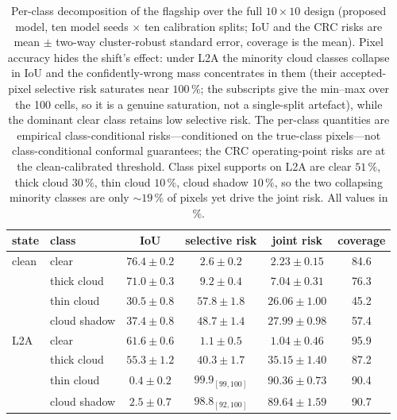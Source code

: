 \documentclass[preprint,3p,times]{elsarticle}
\begin{document}
\begin{table}[t]
\centering
\caption{Per-class decomposition of the flagship over the full $10\times10$ design (proposed model, ten model seeds $\times$ ten calibration splits; IoU and the CRC risks are mean $\pm$ two-way cluster-robust standard error, coverage is the mean). Pixel accuracy hides the shift's effect: under L2A the minority cloud classes collapse in IoU and the confidently-wrong mass concentrates in them (their accepted-pixel selective risk saturates near $100\,\%$; the subscripts give the min--max over the 100 cells, so it is a genuine saturation, not a single-split artefact), while the dominant clear class retains low selective risk. The per-class quantities are empirical class-conditional risks---conditioned on the true-class pixels---not class-conditional conformal guarantees; the CRC operating-point risks are at the clean-calibrated threshold. Class pixel supports on L2A are clear $51\,\%$, thick cloud $30\,\%$, thin cloud $10\,\%$, cloud shadow $10\,\%$, so the two collapsing minority classes are only ${\sim}19\,\%$ of pixels yet drive the joint risk. All values in \%.}
\label{tab:classwise}
\begin{tabular}{llcccc}
\toprule
state & class & IoU & selective risk & joint risk & coverage \\
\midrule
clean & clear        & $76.4\pm0.2$ & $2.6\pm0.2$ & $2.23\pm0.15$ & 84.6 \\
      & thick cloud  & $71.0\pm0.3$ & $9.2\pm0.4$ & $7.04\pm0.31$ & 76.3 \\
      & thin cloud   & $30.5\pm0.8$ & $57.8\pm1.8$ & $26.06\pm1.00$ & 45.2 \\
      & cloud shadow & $37.4\pm0.8$ & $48.7\pm1.4$ & $27.99\pm0.98$ & 57.4 \\
\midrule
L2A   & clear        & $61.6\pm0.6$ & $1.1\pm0.5$ & $1.04\pm0.46$ & 95.9 \\
      & thick cloud  & $55.3\pm1.2$ & $40.3\pm1.7$ & $35.15\pm1.40$ & 87.2 \\
      & thin cloud   & $\mathbf{0.4\pm0.2}$ & $\mathbf{99.9}_{[99,100]}$ & $90.36\pm0.73$ & 90.4 \\
      & cloud shadow & $\mathbf{2.5\pm0.7}$ & $\mathbf{98.8}_{[92,100]}$ & $89.64\pm1.59$ & 90.7 \\
\bottomrule
\end{tabular}
\end{table}
\end{document}
